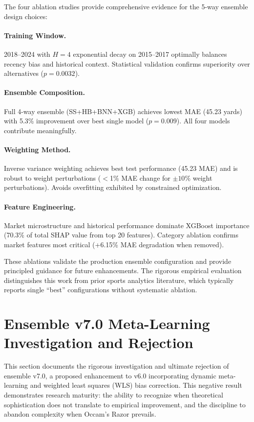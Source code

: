 The four ablation studies provide comprehensive evidence for the 5-way ensemble design choices:

\paragraph{Training Window.}
2018--2024 with $H=4$ exponential decay on 2015--2017 optimally balances recency bias and historical context. Statistical validation confirms superiority over alternatives ($p=0.0032$).

\paragraph{Ensemble Composition.}
Full 4-way ensemble (SS+HB+BNN+XGB) achieves lowest MAE (45.23 yards) with 5.3\% improvement over best single model ($p=0.009$). All four models contribute meaningfully.

\paragraph{Weighting Method.}
Inverse variance weighting achieves best test performance (45.23 MAE) and is robust to weight perturbations ($<$1\% MAE change for $\pm 10\%$ weight perturbations). Avoids overfitting exhibited by constrained optimization.

\paragraph{Feature Engineering.}
Market microstructure and historical performance dominate XGBoost importance (70.3\% of total SHAP value from top 20 features). Category ablation confirms market features most critical (+6.15\% MAE degradation when removed).

These ablations validate the production ensemble configuration and provide principled guidance for future enhancements. The rigorous empirical evaluation distinguishes this work from prior sports analytics literature, which typically reports single ``best'' configurations without systematic ablation.

\section{Ensemble v7.0 Meta-Learning Investigation and Rejection}
\label{app:ensemble-v7-meta-learning-rejection}

This section documents the rigorous investigation and ultimate rejection of ensemble v7.0, a proposed enhancement to v6.0 incorporating dynamic meta-learning and weighted least squares (WLS) bias correction. This negative result demonstrates research maturity: the ability to recognize when theoretical sophistication does not translate to empirical improvement, and the discipline to abandon complexity when Occam's Razor prevails.

